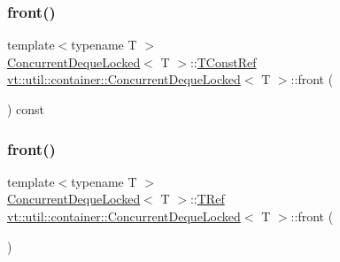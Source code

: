 \subsubsection{\texorpdfstring{front()}{front()}\hspace{0.1cm}{\footnotesize\ttfamily [1/2]}}
{\footnotesize\ttfamily template$<$typename T $>$ \\
\hyperlink{structvt_1_1util_1_1container_1_1_concurrent_deque_locked}{Concurrent\+Deque\+Locked}$<$ T $>$\+::\hyperlink{structvt_1_1util_1_1container_1_1_concurrent_deque_locked_a9da9776dff836c013a95431f3ab15e35}{T\+Const\+Ref} \hyperlink{structvt_1_1util_1_1container_1_1_concurrent_deque_locked}{vt\+::util\+::container\+::\+Concurrent\+Deque\+Locked}$<$ T $>$\+::front (\begin{DoxyParamCaption}{ }\end{DoxyParamCaption}) const}

\mbox{\label{structvt_1_1util_1_1container_1_1_concurrent_deque_locked_a036bb79b4122e2d79f62c61a7715f374}} 
\subsubsection{\texorpdfstring{front()}{front()}\hspace{0.1cm}{\footnotesize\ttfamily [2/2]}}
{\footnotesize\ttfamily template$<$typename T $>$ \\
\hyperlink{structvt_1_1util_1_1container_1_1_concurrent_deque_locked}{Concurrent\+Deque\+Locked}$<$ T $>$\+::\hyperlink{structvt_1_1util_1_1container_1_1_concurrent_deque_locked_a4451b0e7f6c8aa741f98a77a9fed353e}{T\+Ref} \hyperlink{structvt_1_1util_1_1container_1_1_concurrent_deque_locked}{vt\+::util\+::container\+::\+Concurrent\+Deque\+Locked}$<$ T $>$\+::front (\begin{DoxyParamCaption}{ }\end{DoxyParamCaption})}

\mbox{\label{structvt_1_1util_1_1container_1_1_concurrent_deque_locked_af96c5a72abb212cb881833d2c761f2c4}} 
